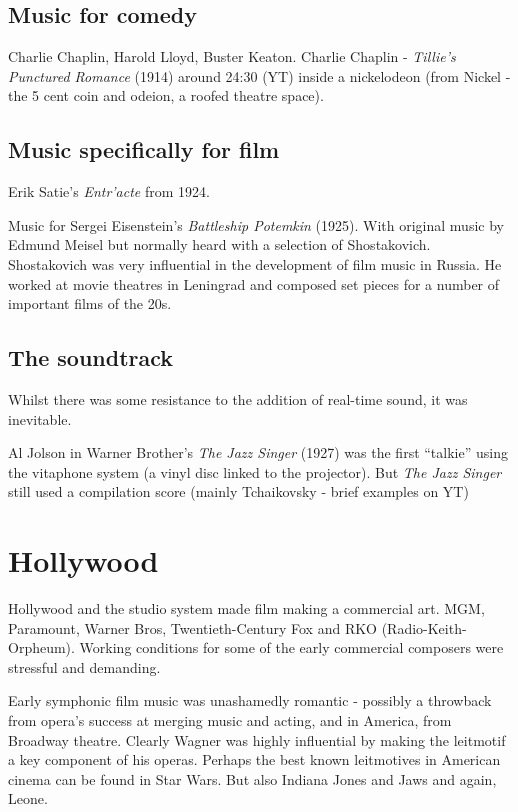 \subsection{Music for comedy}
Charlie Chaplin, Harold Lloyd, Buster Keaton.
Charlie Chaplin - \textit{Tillie's Punctured Romance} (1914) around 24:30 (YT) inside a nickelodeon (from Nickel - the 5 cent coin and odeion, a roofed theatre space).

\subsection{Music specifically for film}
Erik Satie's \textit{Entr'acte} from 1924.

Music for Sergei Eisenstein's \textit{Battleship Potemkin} (1925). With original music by Edmund Meisel but normally heard with a selection of Shostakovich. 
Shostakovich was very influential in the development of film music in Russia. He worked at movie theatres in Leningrad and composed set pieces for a number of important films of the 20s. 

\subsection{The soundtrack}
Whilst there was some resistance to the addition of real-time sound, it was inevitable. 

Al Jolson in Warner Brother's \textit{The Jazz Singer} (1927) was the first ``talkie'' using the vitaphone system (a vinyl disc linked to the projector).
But \textit{The Jazz Singer} still used a compilation score (mainly Tchaikovsky - brief examples on YT) 


\section{Hollywood}

Hollywood and the studio system made film making a commercial art. MGM, Paramount, Warner Bros, Twentieth-Century Fox and RKO (Radio-Keith-Orpheum). Working conditions for some of the early commercial composers were stressful and demanding. 


Early symphonic film music was unashamedly romantic - possibly a throwback from opera's success at merging music and acting, and in America, from Broadway theatre. Clearly Wagner was highly influential by making the leitmotif a key component of his operas. Perhaps the best known leitmotives in American cinema can be found in Star Wars.  
But also Indiana Jones and Jaws and again, Leone. 

